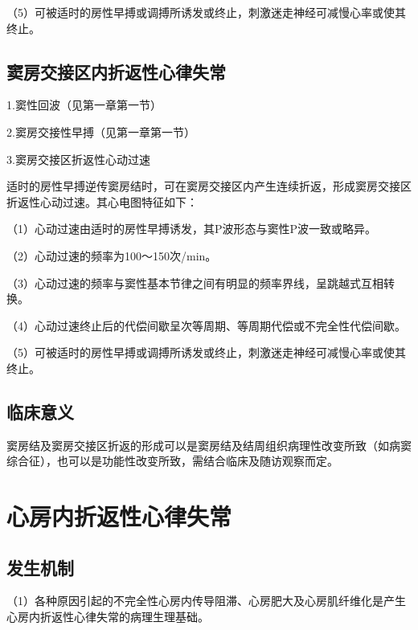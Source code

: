 （5）可被适时的房性早搏或调搏所诱发或终止，刺激迷走神经可减慢心率或使其终止。

\protect\hypertarget{text00021.htmlux5cux23subid232}{}{}

\subsection{窦房交接区内折返性心律失常}

1.窦性回波（见第一章第一节）

2.窦房交接性早搏（见第一章第一节）

3.窦房交接区折返性心动过速

适时的房性早搏逆传窦房结时，可在窦房交接区内产生连续折返，形成窦房交接区折返性心动过速。其心电图特征如下：

（1）心动过速由适时的房性早搏诱发，其P波形态与窦性P波一致或略异。

（2）心动过速的频率为100～150次/min。

（3）心动过速的频率与窦性基本节律之间有明显的频率界线，呈跳越式互相转换。

（4）心动过速终止后的代偿间歇呈次等周期、等周期代偿或不完全性代偿间歇。

（5）可被适时的房性早搏或调搏所诱发或终止，刺激迷走神经可减慢心率或使其终止。

\protect\hypertarget{text00021.htmlux5cux23subid233}{}{}

\subsection{临床意义}

窦房结及窦房交接区折返的形成可以是窦房结及结周组织病理性改变所致（如病窦综合征），也可以是功能性改变所致，需结合临床及随访观察而定。

\protect\hypertarget{text00021.htmlux5cux23subid234}{}{}

\section{心房内折返性心律失常}

\protect\hypertarget{text00021.htmlux5cux23subid235}{}{}

\subsection{发生机制}

（1）各种原因引起的不完全性心房内传导阻滞、心房肥大及心房肌纤维化是产生心房内折返性心律失常的病理生理基础。

